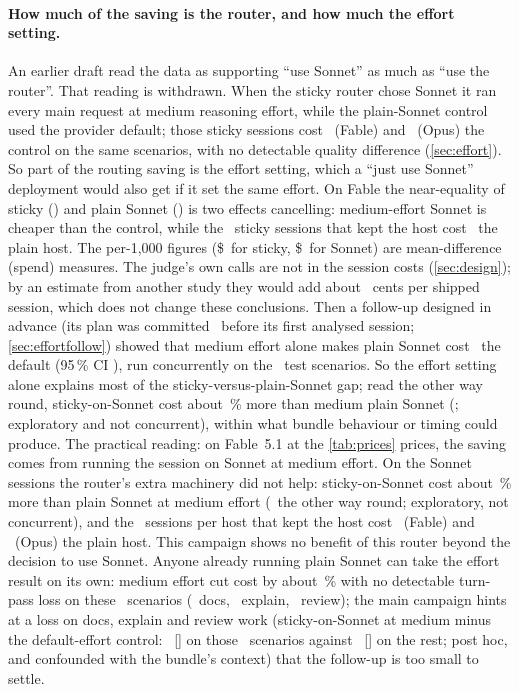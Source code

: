 \paragraph{How much of the saving is the router, and how much the effort setting.} An earlier draft read the data
as supporting ``use Sonnet'' as much as ``use the router''. That reading is withdrawn. When the sticky router chose
Sonnet it ran every main request at medium reasoning effort, while the plain-Sonnet control used the provider
default; those sticky sessions cost \RvEffFableAll\X\ (Fable) and \RvEffOpusAll\X\ (Opus) the control on the same
scenarios, with no detectable quality difference (\cref{sec:effort}). So part of the routing saving is the effort
setting, which a ``just use Sonnet'' deployment would also get if it set the same effort. On Fable the near-equality
of sticky (\CfFableStickyPair\X) and plain Sonnet (\CfFableSonnetPair\X) is two effects cancelling: medium-effort
Sonnet is cheaper than the control, while the \RvStickyHostNFable\ sticky sessions that kept the host cost
\RvStickyHostFable\X\ the plain host. The per-1,000 figures (\$\SavFableSticky\ for sticky, \$\SavFableSonnet\ for
Sonnet) are mean-difference (spend) measures. The judge's own calls are not in the session costs
(\cref{sec:design}); by an estimate from another study they would add about \JudgeShippedCents\ cents per shipped
session, which does not change these conclusions. Then a follow-up designed in advance (its plan was committed \EcFirstAfter\ before its first analysed session;
\cref{sec:effortfollow}) showed that medium effort alone makes plain Sonnet cost \EcRatio\X\ the default (95\,\% CI \EcCI),
run concurrently on the \EcScen\ test scenarios. So the effort setting alone explains most of the
sticky-versus-plain-Sonnet gap; read the other way round, sticky-on-Sonnet cost about \EcSecGapPct\,\% more than medium
plain Sonnet (\EcSecRatio; exploratory and not concurrent), within what bundle behaviour or timing could produce. The
practical reading: on Fable~5.1 at the \cref{tab:prices} prices, the saving comes from running the session on Sonnet at
medium effort. On the Sonnet sessions the router's extra machinery did not help: sticky-on-Sonnet cost about \EcSecGapPct\,\% more
than plain Sonnet at medium effort (\EcSecRatio\ the other way round; exploratory, not concurrent), and the
\RvStickyHostNFable\ sessions per host that kept the host cost \RvStickyHostFableTwo\X\ (Fable) and
\RvStickyHostOpusTwo\X\ (Opus) the plain host. This campaign shows no benefit of this router beyond the decision to use
Sonnet. Anyone already running plain Sonnet can take the effort result on its own: medium effort cut
cost by about \EcCutPct\,\% with no detectable turn-pass loss on these \EcScen\ scenarios (\RvDocsTest\ docs, \RvExplainTest\ explain, \RvReviewTest\ review); the main campaign
hints at a loss on docs, explain and review work (sticky-on-Sonnet at medium minus the default-effort control:
\RvKTDtp\ [\RvKTDtpCI] on those \RvKTN\ scenarios against \RvRestDtp\ [\RvRestDtpCI] on the rest; post hoc, and
confounded with the bundle's context) that the follow-up is too small to settle.

